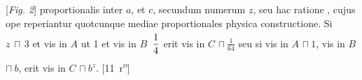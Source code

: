 \noindent \centering
\hspace{-10mm}[\textit{Fig. 2}] 
\pend
\vspace{1.5em}
\pstart \noindent proportionalis inter $\displaystyle a$, et $\displaystyle c$,
secundum numerum $\displaystyle z$, seu
hac ratione ,
cujus ope reperiantur quotcunque mediae proportionales physica constructione.
Si $\displaystyle z \, \sqcap \, 3$ et vis in $\displaystyle A$ ut 1 et vis in $\displaystyle B$ $\displaystyle \, \rule[-4mm]{0mm}{10mm} \frac{1}{4}$
erit vis in $\displaystyle C$ $\displaystyle \sqcap \ \frac{1}{64}$
seu si vis in $\displaystyle A$ $\displaystyle \sqcap \ 1$, vis in $\displaystyle B$ $\displaystyle \sqcap \ b$,
erit vis in $\displaystyle C$ $\displaystyle \sqcap \ b^{z}$. %
[11~r\textsuperscript{o}]
\pend
\count{}
\count{}
\count{}
